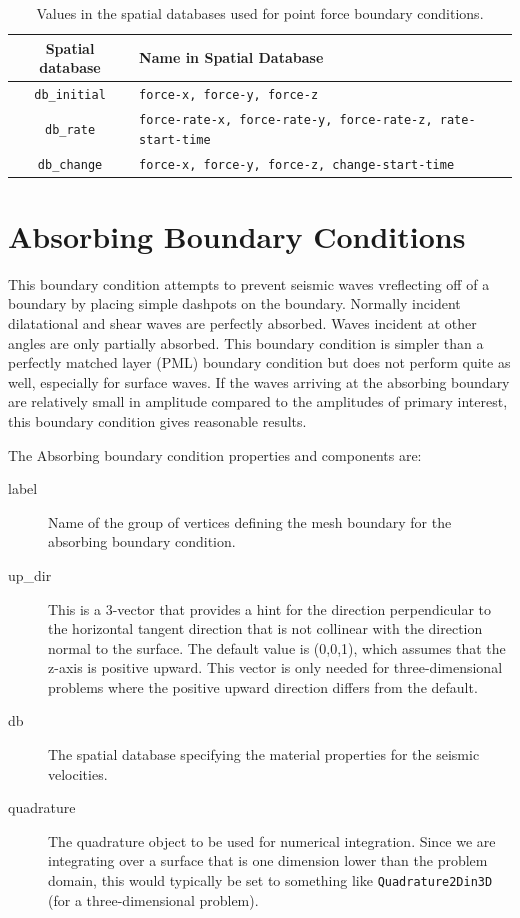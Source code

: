 \noindent \begin{center}
\begin{table}[H]
\noindent \centering{}\caption{Values in the spatial databases used for point force boundary conditions.}
\medskip{}
\begin{tabular}{|c|>{\centering}p{4in}|}
\hline 
\textbf{Spatial database} & \textbf{Name in Spatial Database}\tabularnewline
\hline 
\hline 
\texttt{db\_initial} & \texttt{force-x, force-y, force-z}\tabularnewline
\hline 
\texttt{db\_rate} & \texttt{force-rate-x, force-rate-y, force-rate-z, rate-start-time}\tabularnewline
\hline 
\texttt{db\_change} & \texttt{force-x, force-y, force-z, change-start-time}\tabularnewline
\hline 
\end{tabular}
\end{table}

\par\end{center}


\section{\label{sec:absorbing:boundaries}Absorbing Boundary Conditions}

This boundary condition attempts to prevent seismic waves vreflecting
off of a boundary by placing simple dashpots on the boundary. Normally
incident dilatational and shear waves are perfectly absorbed. Waves
incident at other angles are only partially absorbed. This boundary
condition is simpler than a perfectly matched layer (PML) boundary
condition but does not perform quite as well, especially for surface
waves. If the waves arriving at the absorbing boundary are relatively
small in amplitude compared to the amplitudes of primary interest,
this boundary condition gives reasonable results.

The Absorbing boundary condition properties and components are:
\begin{description}
\item [{label}] Name of the group of vertices defining the mesh boundary
for the absorbing boundary condition.
\item [{up\_dir}] This is a 3-vector that provides a hint for the direction
perpendicular to the horizontal tangent direction that is not collinear
with the direction normal to the surface. The default value is (0,0,1),
which assumes that the z-axis is positive upward. This vector is only
needed for three-dimensional problems where the positive upward direction
differs from the default.
\item [{db}] The spatial database specifying the material properties for
the seismic velocities.
\item [{quadrature}] The quadrature object to be used for numerical integration.
Since we are integrating over a surface that is one dimension lower
than the problem domain, this would typically be set to something
like \texttt{Quadrature2Din3D} (for a three-dimensional problem).
\end{description}

